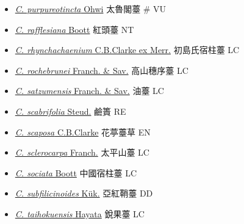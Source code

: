 \begin{itemize}
\begin{itemize}
        \item[] \href{http://www.theplantlist.org/tpl1.1/search?q=Carex+purpureotincta}{\textit{C. purpureotincta} Ohwi}   太魯閣薹  \# VU
        \item[] \href{http://www.theplantlist.org/tpl1.1/search?q=Carex+rafflesiana}{\textit{C. rafflesiana} Boott}   紅頭薹   NT
        \item[] \href{http://www.theplantlist.org/tpl1.1/search?q=Carex+rhynchachaenium}{\textit{C. rhynchachaenium} C.B.Clarke ex Merr.}   初島氏宿柱薹   LC
        \item[] \href{http://www.theplantlist.org/tpl1.1/search?q=Carex+rochebrunei}{\textit{C. rochebrunei} Franch. \& Sav.}   高山穗序薹   LC
        \item[] \href{http://www.theplantlist.org/tpl1.1/search?q=Carex+satzumensis}{\textit{C. satzumensis} Franch. \& Sav.}   油薹   LC
        \item[] \href{http://www.theplantlist.org/tpl1.1/search?q=Carex+scabrifolia}{\textit{C. scabrifolia} Steud.}   鹼簣   RE
        \item[] \href{http://www.theplantlist.org/tpl1.1/search?q=Carex+scaposa}{\textit{C. scaposa} C.B.Clarke}   花葶薹草   EN
        \item[] \href{http://www.theplantlist.org/tpl1.1/search?q=Carex+sclerocarpa}{\textit{C. sclerocarpa} Franch.}   太平山薹   LC
        \item[] \href{http://www.theplantlist.org/tpl1.1/search?q=Carex+sociata}{\textit{C. sociata} Boott}   中國宿柱薹   LC
        \item[] \href{http://www.theplantlist.org/tpl1.1/search?q=Carex+subfilicinoides}{\textit{C. subfilicinoides} Kük.}   亞紅鞘薹   DD
        \item[] \href{http://www.theplantlist.org/tpl1.1/search?q=Carex+taihokuensis}{\textit{C. taihokuensis} Hayata}   銳果薹   LC

\end{itemize}
\end{itemize}
